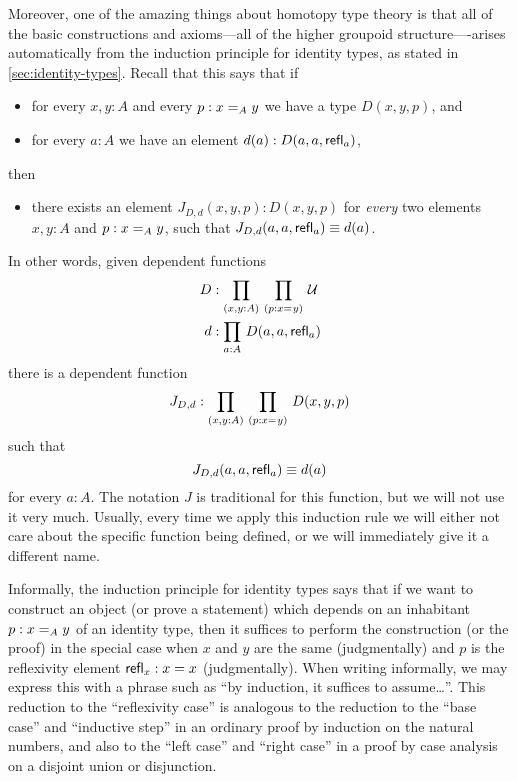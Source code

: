 Moreover, one of the amazing things about homotopy type theory is that all of the basic constructions and axioms---all of the
higher groupoid structure----arises automatically from the induction
principle for identity types, as stated in \autoref{sec:identity-types}.
Recall that this says that if
\begin{itemize}
\item for every $x,y:A$ and every $p:\id[A]xy$ we have a type $D(x,y,p)$, and
\item for every $a:A$ we have an element $d(a):D(a,a,\refl a)$, 
\end{itemize}
then
\begin{itemize}
\item there exists an element $J_{D,d}(x,y,p):D(x,y,p)$ for \emph{every} two elements $x,y:A$ and $p:\id[A]xy$, such that $J_{D,d}(a,a,\refl a) \jdeq d(a)$.
\end{itemize}
In other words, given dependent functions
\begin{align*}
D & :\prd{x,y:A}{p:\id{x}{y}} \type\\
d & :\prd{a:A} D(a,a,\refl{a})
\end{align*}
there is a dependent function
\[J_{D,d}:\prd{x,y:A}{p:\id{x}{y}} D(x,y,p)\]
such that 
\begin{equation}\label{eq:Jconv}
J_{D,d}(a,a,\refl{a})\jdeq d(a)
\end{equation}
for every $a:A$.
The notation $J$ is traditional for this function, but we will not use it very much.
Usually, every time we apply this induction rule we will either not care about the specific function being defined, or we will immediately give it a different name.

Informally, the induction principle for identity types says that if we want to construct an object (or prove a statement) which depends on an inhabitant $p:\id[A]xy$ of an identity type, then it suffices to perform the construction (or the proof) in the special case when $x$ and $y$ are the same (judgmentally) and $p$ is the reflexivity element $\refl{x}:x=x$ (judgmentally).
When writing informally, we may express this with a phrase such as ``by induction, it suffices to assume\dots''.
This reduction to the ``reflexivity case'' is analogous to the reduction to the ``base case'' and ``inductive step'' in an ordinary proof by induction on the natural numbers, and also to the ``left case'' and ``right case'' in a proof by case analysis on a disjoint union or disjunction.

